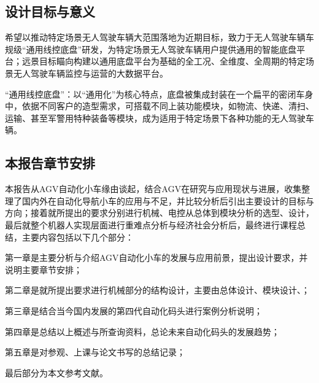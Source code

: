 \subsection{设计目标与意义}

希望以推动特定场景无人驾驶车辆大范围落地为近期目标，致力于无人驾驶车辆车规级“通用线控底盘”研发，为特定场景无人驾驶车辆用户提供通用的智能底盘平台；远景目标瞄向构建以通用底盘平台为基础的全工况、全维度、全周期的特定场景无人驾驶车辆监控与运营的大数据平台。

“通用线控底盘”：以“通用化”为核心特点，底盘被集成封装在一个扁平的密闭车身中，依据不同客户的造型需求，可搭载不同上装功能模块，如物流、快递、清扫、运输、甚至军警用特种装备等模块，成为适用于特定场景下各种功能的无人驾驶车辆。

\subsection{本报告章节安排}

本报告从AGV自动化小车缘由谈起，结合AGV在研究与应用现状与进展，收集整理了国内外在自动化导航小车的应用与不足，并比较分析后引出主要设计的目标与方向；接着就所提出的要求分别进行机械、电控从总体到模块分析的选型、设计，最后就整个机器人实现层面进行重难点分析与经济社会分析后，最终进行课程总结，主要内容包括以下几个部分：

第一章是主要分析与介绍AGV自动化小车的发展与应用前景，提出设计要求，并说明主要章节安排；

第二章是就所提出要求进行机械部分的结构设计，主要由总体设计、模块设计、；

第三章是结合当今国内发展的第四代自动化码头进行案例分析说明；

第四章是总结以上概述与所查询资料，总论未来自动化码头的发展趋势；

第五章是对参观、上课与论文书写的总结记录；

最后部分为本文参考文献。